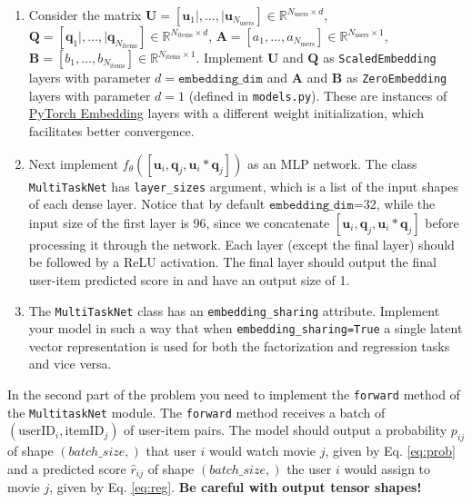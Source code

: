 \documentclass[12pt]{article}
\begin{document}
    \begin{enumerate}
        \item Consider the matrix $\mathbf{U} = [\mathbf{u}_1|,\ldots,|\mathbf{u}_{N_{\text{users}}}]\in\mathbb{R}^{N_{\text{users}}\times d}$, $\mathbf{Q} = [\mathbf{q}_1|,\ldots,|\mathbf{q}_{N_{\text{items}}}]\in\mathbb{R}^{N_{\text{items}}\times d}$, $\mathbf{A} = [a_1, \ldots, a_{N_{\text{users}}}]\in \mathbb{R}^{N_{\text{users}}\times 1}$, $\mathbf{B} = [b_1, \ldots, b_{N_{\text{items}}}]\in \mathbb{R}^{N_{\text{items}}\times 1}$. Implement $\mathbf{U}$ and $\mathbf{Q}$ as \texttt{ScaledEmbedding} layers with parameter $d=\texttt{embedding\_dim}$ and $\mathbf{A}$ and $\mathbf{B}$ as \texttt{ZeroEmbedding} layers with parameter $d=1$ (defined in \texttt{models.py}). These are instances of \href{https://pytorch.org/docs/stable/generated/torch.nn.Embedding.html}{PyTorch Embedding} layers with a different weight initialization, which facilitates better convergence.

        \item Next implement $f_{\theta}([\mathbf{u}_i, \mathbf{q}_j, \mathbf{u}_i * \mathbf{q}_j])$ as an MLP network. The class \texttt{MultiTaskNet} has \texttt{layer\_sizes} argument, which is a list of the input shapes of each dense layer. Notice that by default $\texttt{embedding\_dim}$=32, while the input size of the first layer is 96, since we concatenate $[\mathbf{u}_i, \mathbf{q}_j, \mathbf{u}_i * \mathbf{q}_j]$ before processing it through the network. Each layer (except the final layer) should be followed by a ReLU activation. The final layer should output the final user-item predicted score in and have an output size of 1.

        \item The \texttt{MultiTaskNet} class has an \texttt{embedding\_sharing} attribute. Implement your model in such a way that when  \texttt{embedding\_sharing=True} a single latent vector representation is used for both the factorization and regression tasks and vice versa.

    \end{enumerate}

    \noindent In the second part of the problem you need to implement the \texttt{forward} method of the \texttt{MultitaskNet} module. The \texttt{forward} method receives a batch of $(\text{userID}_i, \text{itemID}_j)$ of user-item pairs. The model should output a probability $p_{ij}$ of shape $(batch\_size,)$ that user $i$ would watch movie $j$, given by Eq. \ref{eq:prob} and a predicted score $\hat{r}_{ij}$ of shape $(batch\_size,)$ the user $i$ would assign to movie $j$, given by Eq. \ref{eq:reg}. \textbf{Be careful with output tensor shapes!}
\end{document}
